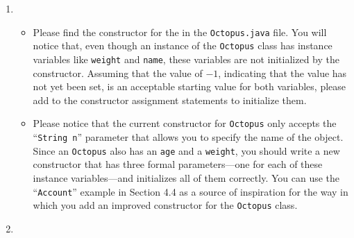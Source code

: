 \begin{enumerate}
\item 

\begin{itemize}


  \item Please find the constructor for the in the {\tt Octopus.java} file.  You will notice that, even though an
    instance of the {\tt Octopus} class has instance variables like {\tt weight} and {\tt name}, these variables are not
    initialized by the constructor. Assuming that the value of $-1$, indicating that the value has not yet been set, is
    an acceptable starting value for both variables, please add to the constructor assignment statements to initialize
    them.
    

  \item Please notice that the current constructor for {\tt Octopus} only accepts the ``{\tt String n}'' parameter that
    allows you to specify the name of the object.  Since an {\tt Octopus} also has an {\tt age} and a {\tt weight}, you
    should write a new constructor that has three formal parameters---one for each of these instance variables---and
    initializes all of them correctly. You can use the ``{\tt Account}'' example in Section 4.4 as a source of
    inspiration for the way in which you add an improved constructor for the {\tt Octopus} class.

\end{itemize} 


\item 
\begin{itemize}


\end{itemize}
\end{enumerate}
